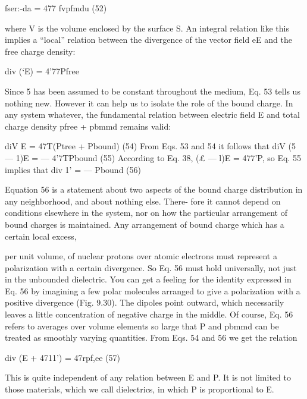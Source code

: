 {{\begin{equation}
\end{equation}
fser:-da = 477 fvpfmdu (52)

where V is the volume enclosed by the surface S. An integral relation
like this implies a ``local'' relation between the divergence of
the vector field eE and the free charge density:

\begin{equation}
\end{equation}
div (‘E) = 4'77Pfree 

Since 5 has been assumed to be constant throughout the medium,
Eq. 53 tells us nothing new. However it can help us to isolate the
role of the bound charge. In any system whatever, the fundamental
relation between electric field E and total charge density pfree + pbmmd
remains valid:

\begin{equation}
\end{equation}
diV E = 47T(Ptree + Pbound) (54)
From Eqs. 53 and 54 it follows that
diV (5  ---  1)E =  --- 4'7TPbound (55)
According to Eq. 38, (£  ---  l)E = 477'P, so Eq. 55 implies that
div 1' =  --- Pbound (56)

Equation 56 is a statement about two aspects of the bound charge
distribution in any neighborhood, and about nothing else. There-
fore it cannot depend on conditions elsewhere in the system, nor
on how the particular arrangement of bound charges is maintained.
Any arrangement of bound charge which has a certain local excess,

per unit volume, of nuclear protons over atomic electrons must
represent a polarization with a certain divergence. So Eq. 56 must
hold universally, not just in the unbounded dielectric. You can get
a feeling for the identity expressed in Eq. 56 by imagining a few polar
molecules arranged to give a polarization with a positive divergence
(Fig. 9.30). The dipoles point outward, which necessarily leaves a
little concentration of negative charge in the middle. Of course,
Eq. 56 refers to averages over volume elements so large that P and
pbmmd can be treated as smoothly varying quantities.
From Eqs. 54 and 56 we get the relation

\begin{equation}
\end{equation}
div (E + 4711') = 47rpf,ee (57)

This is quite independent of any relation between E and P. It is not
limited to those materials, which we call dielectrics, in which P is
proportional to E.

}}
